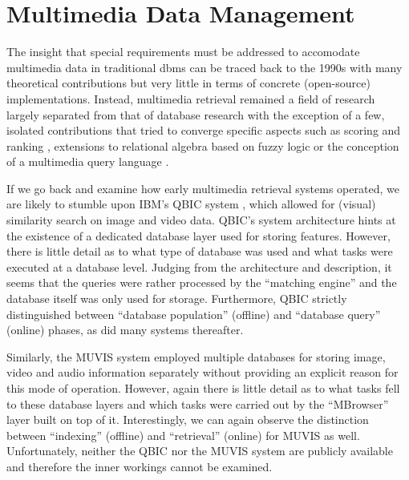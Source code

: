 \chapter{Multimedia Data Management}
\label{chapter:theory_multimedia_database}

The insight that special requirements must be addressed to accomodate multimedia data in traditional \acrshort{dbms} can be traced back to the 1990s \cite{Marcus:1996Foundations,Adjeroh:1997Multimedia} with many theoretical contributions but very little in terms of concrete (open-source) implementations. Instead, multimedia retrieval remained a field of research largely separated from that of database research with the exception of a few, isolated contributions that tried to converge specific aspects such as scoring and ranking \cite{Chengkai:2005RankSQL,Zhang:2006Boolean}, extensions to relational algebra based on fuzzy logic \cite{Montesi:1999Similarity} or the conception of a multimedia query language \cite{Budikova:2012Query}.

If we go back and examine how early multimedia retrieval systems operated, we are likely to stumble upon IBM's QBIC system \cite{Flickner:1995Query}, which allowed for (visual) similarity search on image and video data. QBIC's system architecture hints at the existence of a dedicated database layer used for storing features. However, there is little detail as to what type of database was used and what tasks were executed at a database level. Judging from the architecture and description, it seems that the queries were rather processed by the ``matching engine'' and the database itself was only used for storage. Furthermore, QBIC strictly distinguished between ``database population'' (offline) and ``database query'' (online) phases, as did many systems thereafter.

Similarly, the MUVIS \cite{Kiranyaz:2003Muvis} system employed multiple databases for storing image, video and audio information separately without providing an explicit reason for this mode of operation. However, again there is little detail as to what tasks fell to these database layers and which tasks were carried out by the ``MBrowser'' layer built on top of it. Interestingly, we can again observe the distinction between ``indexing'' (offline) and ``retrieval'' (online) for MUVIS as well. Unfortunately, neither the QBIC nor the MUVIS system are publicly available and therefore the inner workings cannot be examined.

